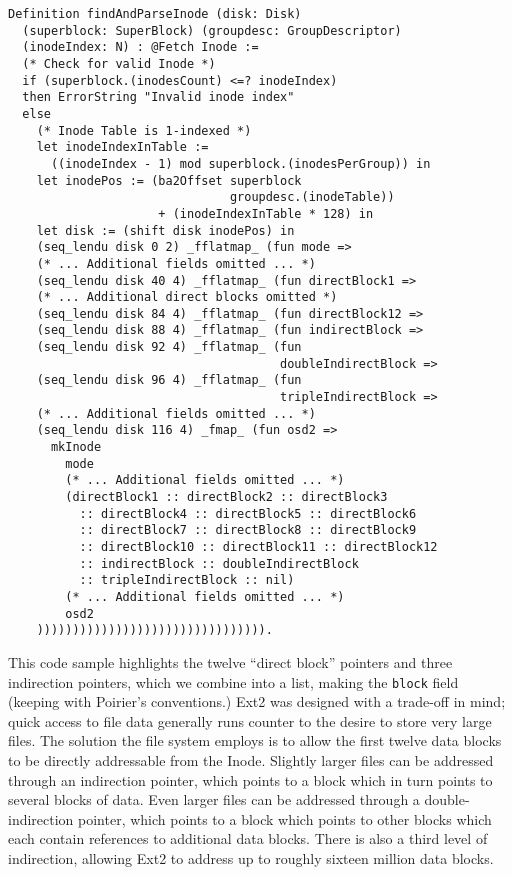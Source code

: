 \documentclass[nocopyrightspace,preprint]{sigplanconf}
\begin{document}
\begin{lstlisting}
Definition findAndParseInode (disk: Disk) 
  (superblock: SuperBlock) (groupdesc: GroupDescriptor)
  (inodeIndex: N) : @Fetch Inode :=
  (* Check for valid Inode *)
  if (superblock.(inodesCount) <=? inodeIndex)
  then ErrorString "Invalid inode index"
  else
    (* Inode Table is 1-indexed *)
    let inodeIndexInTable := 
      ((inodeIndex - 1) mod superblock.(inodesPerGroup)) in
    let inodePos := (ba2Offset superblock
                               groupdesc.(inodeTable))
                     + (inodeIndexInTable * 128) in
    let disk := (shift disk inodePos) in
    (seq_lendu disk 0 2) _fflatmap_ (fun mode =>
    (* ... Additional fields omitted ... *)
    (seq_lendu disk 40 4) _fflatmap_ (fun directBlock1 =>
    (* ... Additional direct blocks omitted *)
    (seq_lendu disk 84 4) _fflatmap_ (fun directBlock12 =>
    (seq_lendu disk 88 4) _fflatmap_ (fun indirectBlock =>
    (seq_lendu disk 92 4) _fflatmap_ (fun 
                                      doubleIndirectBlock =>
    (seq_lendu disk 96 4) _fflatmap_ (fun 
                                      tripleIndirectBlock =>
    (* ... Additional fields omitted ... *)
    (seq_lendu disk 116 4) _fmap_ (fun osd2 =>
      mkInode
        mode
        (* ... Additional fields omitted ... *)
        (directBlock1 :: directBlock2 :: directBlock3
          :: directBlock4 :: directBlock5 :: directBlock6
          :: directBlock7 :: directBlock8 :: directBlock9
          :: directBlock10 :: directBlock11 :: directBlock12
          :: indirectBlock :: doubleIndirectBlock
          :: tripleIndirectBlock :: nil)
        (* ... Additional fields omitted ... *)
        osd2
    )))))))))))))))))))))))))))))))).
\end{lstlisting}

This code sample highlights the twelve ``direct block'' pointers and three
indirection pointers, which we combine into a list, making the {\tt block}
field (keeping with Poirier's conventions.) Ext2 was designed with a trade-off
in mind; quick access to file data generally runs counter to the desire to
store very large files.  The solution the file system employs is to allow the
first twelve data blocks to be directly addressable from the Inode. Slightly
larger files can be addressed through an indirection pointer, which points to
a block which in turn points to several blocks of data. Even larger files can
be addressed through a double-indirection pointer, which points to a block
which points to other blocks which each contain references to additional data
blocks. There is also a third level of indirection, allowing Ext2 to address
up to roughly sixteen million data blocks.
\end{document}
